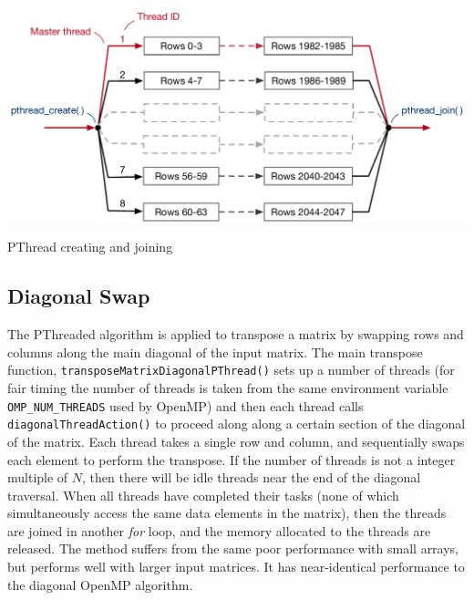 \documentclass[10 pt, conference]{cssconf}
\begin{document}
\begin{multicols}{2}
\vspace{12pt}
\begin{Figure}
    {\includegraphics[width=1\linewidth]{images/threads.pdf}}
    \caption{PThread creating and joining}
    \label{fig:thread_creation}
\end{Figure}%

\subsection{Diagonal Swap}
The PThreaded algorithm is applied to transpose a matrix by swapping rows and columns along the main diagonal of the input matrix. The main transpose function, \verb|transposeMatrixDiagonalPThread()| sets up a number of threads (for fair timing the number of threads is taken from the same environment variable \verb|OMP_NUM_THREADS| used by OpenMP) and then each thread calls \verb|diagonalThreadAction()| to proceed along along a certain section of the diagonal of the matrix. Each thread takes a single row and column, and sequentially swaps each element to perform the transpose. If the number of threads is not a integer multiple of $N$, then there will be idle threads near the end of the diagonal traversal. When all threads have completed their tasks (none of which simultaneously access the same data elements in the matrix), then the threads are joined in another \textit{for} loop, and the memory allocated to the threads are released.
The method suffers from the same poor performance with small arrays, but performs well with larger input matrices. It has near-identical performance to the diagonal OpenMP algorithm.


\end{multicols}
\end{document}

